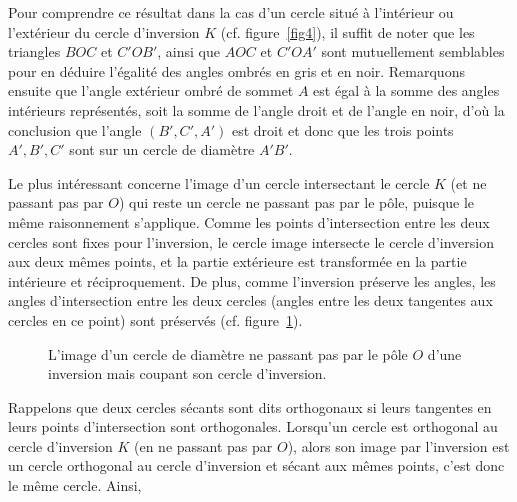 Pour comprendre ce résultat dans la cas d'un cercle situé à l'intérieur ou l'extérieur du cercle d'inversion $K$ (cf. figure~\ref{fig4}), il suffit de noter que les triangles $BOC$ et $C'OB'$, ainsi que $AOC$ et $C'OA'$ sont mutuellement semblables pour en déduire l'égalité des angles ombrés en gris et en noir. Remarquons ensuite que l'angle extérieur ombré de sommet $A$ est égal à la somme des angles intérieurs représentés, soit la somme de l'angle droit et de l'angle en noir, d'où la conclusion que l'angle $(B',C',A')$ est droit et donc que les trois points $A',B',C'$ sont sur un cercle de diamètre $A'B'$.

Le plus intéressant concerne l'image d'un cercle intersectant le cercle $K$ (et ne passant pas par $O$) qui reste un cercle ne passant pas par le pôle, puisque le même raisonnement s'applique. Comme les points d'intersection entre les deux cercles sont fixes pour l'inversion, le cercle image intersecte le cercle d'inversion aux deux mêmes points, et la partie extérieure est transformée en la partie intérieure et réciproquement. De plus, comme l'inversion préserve les angles, les angles d'intersection entre les deux cercles (angles entre les deux tangentes aux cercles en ce point) sont préservés (cf. figure~\ref{fig5}). 

\begin{figure}[ht]
\begin{center}
\shorthandon{!}\shorthandoff{:}
\caption{\small L'image d'un cercle de diamètre ne passant pas par le pôle $O$ d'une inversion mais coupant son cercle d'inversion.}\label{fig5}
\end{center}
\end{figure}
Rappelons que deux cercles sécants sont dits orthogonaux si leurs tangentes en leurs points d'intersection sont orthogonales. Lorsqu'un cercle est orthogonal au cercle d'inversion $K$ (en ne passant pas par $O$), alors son image par l'inversion est un cercle orthogonal au cercle d'inversion et sécant aux mêmes points, c'est donc le même cercle.
Ainsi,

